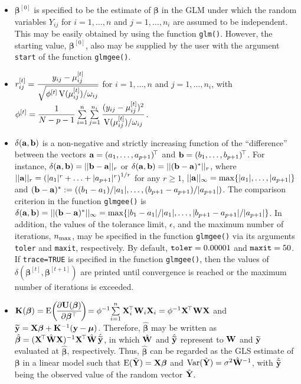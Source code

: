 \begin{itemize}
\item $\bm{\beta}^{[0]}$ is specified to be the estimate of $\bm{\beta}$ in the GLM under which the random variables $Y_{ij}$ for $i=1,\ldots,n$ and $j=1,\ldots,n_i$ are assumed to be independent. This may be easily obtained by using the function {\tt glm()}. However, the starting value, $\bm{\beta}^{[0]}$, also may be supplied by the user with the argument {\tt start} of the function {\tt glmgee()}.
\item $r^{[t]}_{ij}=\dfrac{y_{ij}-\mu^{[t]}_{ij}}{\sqrt{\phi^{[t]}\,{\rm V}(\mu^{[t]}_{ij})/\omega_{ij}}}$ for $i=1,\ldots,n$ and $j=1,\ldots,n_i$, with $\phi^{[t]}=\dfrac{1}{N-p-1}\sum\limits_{i=1}^n\sum\limits_{j=1}^{n_i}\dfrac{(y_{ij}-\mu^{[t]}_{ij})^2}{{\rm V}(\mu^{[t]}_{ij})/\omega_{ij}}$.
\item $\delta({\bf a},{\bf b})$ is a non-negative and strictly increasing function of the ``difference'' between the vectors ${\bf a}=(a_1,\ldots,a_{p+1})^{\!\top}$ and ${\bf b}=(b_1,\ldots,b_{p+1})^{\!\top}$. For instance, $\delta({\bf a},{\bf b})=||{\bf b-a}||_r$ or $\delta({\bf a},{\bf b})=||({\bf b-a})^*||_r$, where $||{\bf a}||_r=\left(|a_1|^r+\ldots+|a_{p+1}|^r\right)^{1/r}$ for any $r\geq 1$, $||{\bf a}||_{\infty}={\rm max}\{|a_1|,\ldots,|a_{p+1}|\}$ and $({\bf b-a})^*:=\left((b_1-a_1)/|a_1|,\ldots,(b_{p+1}-a_{p+1})/|a_{p+1}|\right)$. The comparison criterion in the function {\tt glmgee()} is $\delta({\bf a},{\bf b})=||({\bf b-a})^*||_{\infty}={\rm max}\{|b_1-a_1|/|a_1|,\ldots,|b_{p+1}-a_{p+1}|/|a_{p+1}|\}$. In addition, the values of the tolerance limit, $\epsilon$, and the maximum number of iterations, $n_{\rm max}$, may be specified in the function {\tt glmgee()} via its arguments {\tt toler} and {\tt maxit}, respectively. By default, ${\tt toler}=0.00001$ and ${\tt maxit}=50$. If {\tt trace=TRUE} is specified in the function {\tt glmgee()}, then the values of $\delta(\bm{\beta}^{[t]},\bm{\beta}^{[t+1]})$ are printed until convergence is reached or the maximum number of iterations is exceeded.
\item ${\bf K}(\bm{\beta})={\rm E}\!\left(\!\dfrac{\partial{\bf U}(\bm{\beta})}{\partial \bm{\beta}^{\top}}\!\right)\!=\phi^{-1}\!\sum\limits_{i=1}^n{\bf X}_i^{\!\top}{\bf W}_i{\bf X}_i=\phi^{-1}{\bf X}^{\!\top}{\bf W}{\bf X}$ and $\widetilde{\bf y}={\bf X}\bm{\beta} + {\bf K}^{-1}({\bf y}-\bm{\mu})$. Therefore, $\hat{\bm{\beta}}$ may be written as
$\hat{\bm{\beta}}=({\bf X}^{\!\top}\hat{\bf W}{\bf X})^{-1}{\bf X}^{\!\top}\hat{\bf W}\,\hat{\widetilde{\bf y}}$, in which
$\hat{\bf W}$ and $\hat{\widetilde{\bf y}}$ represent to ${\bf W}$ and ${\widetilde{\bf y}}$ evaluated at $\hat{\bm{\beta}}$, respectively. Thus, $\hat{\bm{\beta}}$ can be regarded as the GLS estimate of ${\bm{\beta}}$ in a linear model such that ${\rm E}({\tilde{\bf Y}})={\bf X}\bm{\beta}$ and ${\rm Var}({\tilde{\bf Y}})=\sigma^2\hat{\bf W}^{-1}$, with $\hat{\widetilde{\bf y}}$ being the observed value of the random vector ${\tilde{\bf Y}}$.
 \end{itemize}

